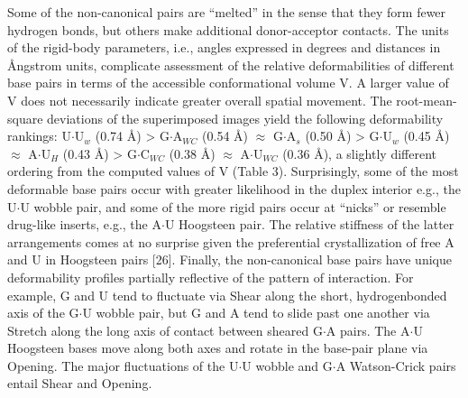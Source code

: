 Some of the
non-canonical pairs are  ``melted'' in the sense that  they form fewer
hydrogen   bonds,   but    others   make   additional   donor-acceptor
contacts.  The  units  of  the  rigid-body  parameters,  i.e.,  angles
expressed  in  degrees and  distances  in  Ångstrom units,  complicate
assessment of the relative  deformabilities of different base pairs in
terms of the  accessible conformational volume V. A  larger value of V
does not  necessarily indicate  greater overall spatial  movement. The
root-mean-square  deviations  of  the  superimposed images  yield  the
following  deformability   rankings:  U$\cdot$U$_{w}$  (0.74   \AA)  >
G$\cdot$A$_{WC}$  (0.54 \AA)  $\approx$ G$\cdot$A$_{s}$  (0.50  \AA) >
G$\cdot$U$_{w}$  (0.45  \AA) $\approx$  A$\cdot$U$_{H}$  (0.43 \AA)  >
G$\cdot$C$_{WC}$ (0.38  \AA) $\approx$ A$\cdot$U$_{WC}$  (0.36 \AA), a
slightly  different ordering  from  the computed  values  of V  (Table
3). Surprisingly,  some of the  most deformable base pairs  occur with
greater likelihood  in the duplex interior e.g.,  the U$\cdot$U wobble
pair, and some of the more  rigid pairs occur at ``nicks'' or resemble
drug-like inserts,  e.g., the  A$\cdot$U Hoogsteen pair.  The relative
stiffness of  the latter arrangements  comes at no surprise  given the
preferential crystallization of free A  and U in Hoogsteen pairs [26].
Finally,  the  non-canonical  base  pairs  have  unique  deformability
profiles  partially  reflective of  the  pattern  of interaction.  For
example,  G  and  U tend  to  fluctuate  via  Shear along  the  short,
hydrogenbonded axis of the G$\cdot$U wobble  pair, but G and A tend to
slide  past one another  via Stretch  along the  long axis  of contact
between sheared  G$\cdot$A pairs.  The A$\cdot$U Hoogsteen  bases move
along both  axes and  rotate in the  base-pair plane via  Opening. The
major fluctuations of the  U$\cdot$U wobble and G$\cdot$A Watson-Crick
pairs entail Shear and Opening.

